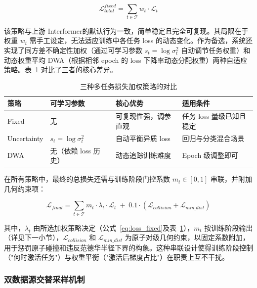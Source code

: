 \begin{equation}
\mathcal{L}_{total}^{fixed} = \sum_{t \in \mathcal{T}} w_t \cdot \mathcal{L}_t
\label{eq:loss_fixed}
\end{equation}

该策略与上游 Interformer\cite{lai2024interformer}的默认行为一致，简单稳定且完全可复现。其局限在于权重 $w_t$ 需手工设定，无法适应训练中各任务 loss 的动态变化。作为备选，系统还实现了同方差不确定性加权（通过可学习参数 $s_t = \log \sigma_t^2$ 自动调节任务权重）\cite{kendall2018multi}和动态权重平均 DWA（根据相邻 epoch 的 loss 下降率动态分配权重）\cite{liu2019end}两种自适应策略。表~\ref{T.strategy_comparison} 对比了三者的核心差异。

\begin{table}[htb]
  \centering
  \caption{三种多任务损失加权策略的对比}
  \label{T.strategy_comparison}
  \small
  \begin{tabular}{p{2.2cm}p{3.0cm}p{3.2cm}p{3.0cm}}
    \toprule
    策略 & 可学习参数 & 核心优势 & 适用条件 \\
    \midrule
    Fixed & 无 & 可复现性强，调参直观 & 任务 loss 量级已知且稳定 \\
    Uncertainty\cite{kendall2018multi} & $s_t = \log \sigma_t^2$ & 自动平衡异质 loss & 回归与分类混合场景 \\
    DWA\cite{liu2019end} & 无（依赖 loss 历史） & 动态追踪训练难度 & Epoch 级调整即可 \\
    \bottomrule
  \end{tabular}
\end{table}

在所有策略中，最终的总损失还需与训练阶段门控系数 $m_t \in [0, 1]$ 串联，并附加几何约束项：

\begin{equation}
\mathcal{L}_{final} = \sum_{t \in \mathcal{T}} m_t \cdot \lambda_t \cdot \mathcal{L}_t \;+\; 0.1 \cdot (\mathcal{L}_{collision} + \mathcal{L}_{min\_dist})
\label{eq:loss_final}
\end{equation}

其中，$\lambda_t$ 由所选加权策略决定（公式~\ref{eq:loss_fixed}及表~\ref{T.strategy_comparison}），$m_t$ 按训练阶段输出（详见下一小节），$\mathcal{L}_{collision}$ 和 $\mathcal{L}_{min\_dist}$ 为原子对级几何约束，以固定系数附加，用于惩罚原子碰撞和违反范德华半径下界的构象。这种串联设计使得训练阶段控制（"何时激活任务"）与权重平衡（"激活后梯度占比"）在职责上互不干扰\cite{zhang2021survey}。

\subsubsection{双数据源交替采样机制}

